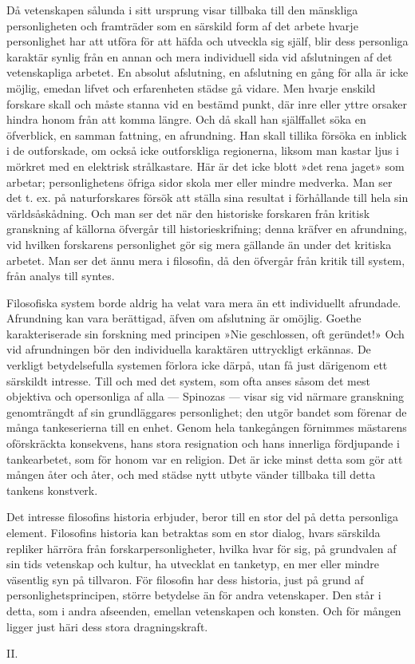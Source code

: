 \documentclass[12pt]{article}
\newcommand{\opage}[1]{\marginnote{\footnotesize\textit{[#1]}}}
\begin{document}
Då vetenskapen sålunda i sitt ursprung visar tillbaka till den mänskliga personligheten och framträder som en särskild form af det arbete hvarje personlighet har att utföra för att häfda och utveckla sig själf, blir dess personliga karaktär synlig från en annan och mera individuell sida vid afslutningen af det vetenskapliga arbetet. En absolut afslutning, en afslutning en gång för alla är icke möjlig, emedan lifvet och erfarenheten städse gå vidare. Men hvarje enskild forskare skall och måste stanna vid en bestämd punkt, där inre eller yttre orsaker hindra honom från att komma längre. Och då skall han själffallet söka en öfverblick, en samman%
\opage{16}
fattning, en afrundning. Han skall tillika försöka en inblick i de outforskade, om också icke outforskliga regionerna, liksom man kastar ljus i mörkret med en elektrisk strålkastare. Här är det icke blott »det rena jaget» som arbetar; personlighetens öfriga sidor skola mer eller mindre medverka. Man ser det t. ex. på naturforskares försök att ställa sina resultat i förhållande till hela sin världsåskådning. Och man ser det när den historiske forskaren från kritisk granskning af källorna öfvergår till historieskrifning; denna kräfver en afrundning, vid hvilken forskarens personlighet gör sig mera gällande än under det kritiska arbetet. Man ser det ännu mera i filosofin, då den öfvergår från kritik till system, från analys till syntes.

Filosofiska system borde aldrig ha velat vara mera än ett individuellt afrundade. Afrundning kan vara berättigad, äfven om afslutning är omöjlig. Goethe karakteriserade sin forskning med principen »Nie geschlossen, oft geründet!» %
 Och vid afrundningen bör den individuella karaktären uttryckligt erkännas. De verkligt betydelsefulla systemen förlora icke därpå, utan få just därigenom ett särskildt intresse. Till och med det system, %
\opage{17}
som ofta anses såsom det mest objektiva och opersonliga af alla --- Spinozas --- visar sig vid närmare granskning genomträngdt af sin grundläggares personlighet; den utgör bandet som förenar de många tankeserierna till en enhet. Genom hela tankegången förnimmes mästarens oförskräckta konsekvens, hans stora resignation och hans innerliga fördjupande i tankearbetet, som för honom var en religion. Det är icke minst detta som gör att mången åter och åter, och med städse nytt utbyte vänder tillbaka till detta tankens konstverk. 

Det intresse filosofins historia erbjuder, beror till en stor del på detta personliga element. Filosofins historia kan betraktas som en stor dialog, hvars särskilda repliker härröra från forskarpersonligheter, hvilka hvar för sig, på grundvalen af sin tids vetenskap och kultur, ha utvecklat en tanketyp, en mer eller mindre väsentlig syn på tillvaron. För filosofin har dess historia, just på grund af personlighetsprincipen, större betydelse än för andra vetenskaper. Den står i detta, som i andra afseenden, emellan vetenskapen och konsten. Och för mången ligger just häri dess stora dragningskraft. %
\opage{18}
\begin{center}\large II.\end{center}
\end{document}
